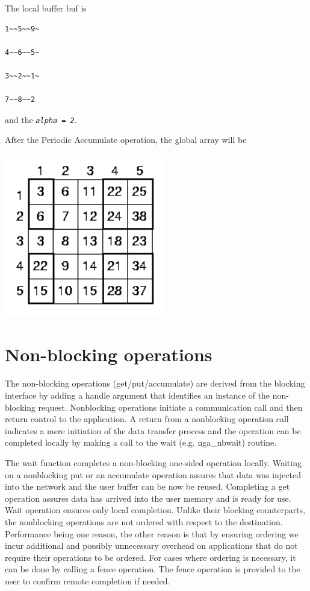The local buffer buf is
\begin{verbatim}
1~~5~~9~

4~~6~~5~

3~~2~~1~

7~~8~~2
\end{verbatim}
and the \texttt{\emph{alpha = 2}}.

After the Periodic Accumulate operation, the global array will be

\includegraphics[width=7cm]{periodic5}


\section{Non-blocking operations}

The non-blocking operations (get/put/accumulate) are derived from
the blocking interface by adding a handle argument that identifies
an instance of the non-blocking request. Nonblocking operations initiate
a communication call and then return control to the application. A
return from a nonblocking operation call indicates a mere initiation
of the data transfer process and the operation can be completed locally
by making a call to the wait (e.g. nga\_nbwait) routine.

The wait function completes a non-blocking one-sided operation locally.
Waiting on a nonblocking put or an accumulate operation assures that
data was injected into the network and the user buffer can be now
be reused. Completing a get operation assures data has arrived into
the user memory and is ready for use. Wait operation ensures only
local completion. Unlike their blocking counterparts, the nonblocking
operations are not ordered with respect to the destination. Performance
being one reason, the other reason is that by ensuring ordering we
incur additional and possibly unnecessary overhead on applications
that do not require their operations to be ordered. For cases where
ordering is necessary, it can be done by calling a fence operation.
The fence operation is provided to the user to confirm remote completion
if needed.


